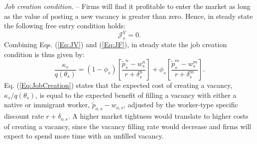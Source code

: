 \documentclass[a4paper,12pt]{article}
\begin{document}
\emph{Job creation condition}. --
Firms will find it profitable to enter the market as long as the value of
posting a new vacancy is greater than zero. Hence, in steady state the
following free entry condition holds: 
\begin{equation}
\mathcal{J}_{s}^{V}=0.  \label{Eq:FreeEntry}
\end{equation}%
Combining Eqs. (\ref{Eq:JV}) and (\ref{Eq:JF}), in steady state the job
creation condition is thus given by:
\begin{equation}
\frac{\kappa _{s}}{q\left( \theta _{s}\right) }=\left( 1-\phi _{s}\right) %
\left[ \frac{\widetilde{p}_{s}^{n}-w_{s}^{n}}{r+\delta _{s}^{n}}\right] +\phi _{s}\left[ 
\frac{\widetilde{p}_{s}^{m}-w_{s}^{m}}{r+\delta _{s}^{m}}\right] .
\label{Eq:JobCreation}
\end{equation}%
Eq. (\ref{Eq:JobCreation}) states that the expected cost of creating a
vacancy, $\kappa _{s}/q\left( \theta _{s}\right) $, is equal to the expected
benefit of filling a vacancy with either a native or immigrant worker, $%
\widetilde{p}_{o,s}-w_{o,s}$, adjusted by the worker-type specific discount rate $%
r+\delta _{o,s}$. A higher market tightness would translate to higher costs
of creating a vacancy, since the vacancy filling rate would decrease and
firms will expect to spend more time with an unfilled vacancy.
\end{document}
